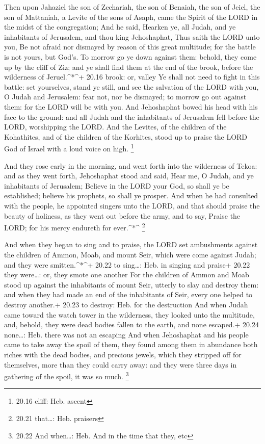  Then upon Jahaziel the son of Zechariah, the son of
Benaiah, the son of Jeiel, the son of Mattaniah, a Levite of the sons of
Asaph, came the Spirit of the LORD in the midst of the congregation;
 And he said, Hearken ye, all Judah, and ye inhabitants of
Jerusalem, and thou king Jehoshaphat, Thus saith the LORD unto you, Be
not afraid nor dismayed by reason of this great multitude; for the
battle is not yours, but God's.  To morrow go ye down
against them: behold, they come up by the cliff of Ziz; and ye shall
find them at the end of the brook, before the wilderness of
Jeruel.\^{}*\^{}+ 20.16 brook: or, valley  Ye shall not
need to fight in this battle: set yourselves, stand ye still, and see
the salvation of the LORD with you, O Judah and Jerusalem: fear not, nor
be dismayed; to morrow go out against them: for the LORD will be with
you.  And Jehoshaphat bowed his head with his face to the
ground: and all Judah and the inhabitants of Jerusalem fell before the
LORD, worshipping the LORD.  And the Levites, of the
children of the Kohathites, and of the children of the Korhites, stood
up to praise the LORD God of Israel with a loud voice on high.
\footnote{20.16 cliff: Heb. ascent}

 And they rose early in the morning, and went forth into
the wilderness of Tekoa: and as they went forth, Jehoshaphat stood and
said, Hear me, O Judah, and ye inhabitants of Jerusalem; Believe in the
LORD your God, so shall ye be established; believe his prophets, so
shall ye prosper.  And when he had consulted with the
people, he appointed singers unto the LORD, and that should praise the
beauty of holiness, as they went out before the army, and to say, Praise
the LORD; for his mercy endureth for ever.\^{}*\^{} \footnote{20.21
  that\ldots: Heb. praisers}

 And when they began to sing and to praise, the LORD set
ambushments against the children of Ammon, Moab, and mount Seir, which
were come against Judah; and they were smitten.\^{}*\^{}+ 20.22 to
sing\ldots: Heb. in singing and praise+ 20.22 they were\ldots: or, they
smote one another  For the children of Ammon and Moab stood
up against the inhabitants of mount Seir, utterly to slay and destroy
them: and when they had made an end of the inhabitants of Seir, every
one helped to destroy another.+ 20.23 to destroy: Heb. for the
destruction  And when Judah came toward the watch tower in
the wilderness, they looked unto the multitude, and, behold, they were
dead bodies fallen to the earth, and none escaped.+ 20.24 none\ldots:
Heb. there was not an escaping  And when Jehoshaphat and
his people came to take away the spoil of them, they found among them in
abundance both riches with the dead bodies, and precious jewels, which
they stripped off for themselves, more than they could carry away: and
they were three days in gathering of the spoil, it was so much.
\footnote{20.22 And when\ldots: Heb. And in the time that they, etc}

